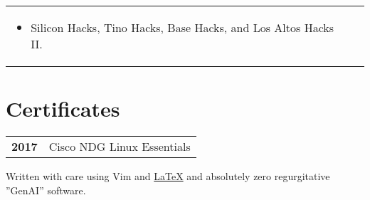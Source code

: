 \documentclass[lighthipster]{simplehipstercv}
\begin{document}
\begin{paracol}{2}
\begin{tabular}{p{} c}
{\begin{itemize}[leftmargin=4mm, itemsep=0.3mm]
            \item Silicon Hacks, Tino Hacks, Base Hacks, and Los Altos Hacks II.
        \end{itemize}
    }
  \end{tabular}
  \vspace{3em}


  \section*{Certificates}
  \begin{tabular}{>{\footnotesize\bfseries}r >{\footnotesize}p{}}
    2017 & Cisco NDG Linux Essentials
  \end{tabular}
  \bigskip




  \vfill{} %
  \vspace{26em}
  \vfill
  \begin{center}\fontfamily{\sfdefault}\selectfont \color{black!90}
    {
      \small
      Written with care using Vim and \href{https://github.com/izcet/latex-resume}{\LaTeX{}} and absolutely zero regurgitative ''GenAI'' software.

}
\end{center}
\end{paracol}
\end{document}
